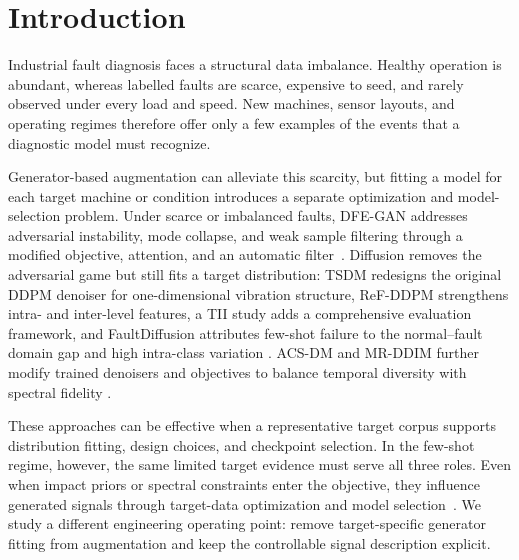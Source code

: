 \documentclass[a4paper,fleqn]{cas-sc}
\begin{document}
\maketitle

\section{Introduction}
\label{sec:intro}

Industrial fault diagnosis faces a structural data imbalance. Healthy
operation is abundant, whereas labelled faults are scarce, expensive to seed,
and rarely observed under every load and speed. New machines, sensor layouts,
and operating regimes therefore offer only a few examples of the events that a
diagnostic model must recognize.

Generator-based augmentation can alleviate this scarcity, but fitting a model
for each target machine or condition introduces a separate optimization and
model-selection problem. Under scarce or imbalanced faults, DFE-GAN addresses
adversarial instability, mode collapse, and weak sample filtering through a
modified objective, attention, and an automatic filter~\citep{liu2022dfegan}.
Diffusion removes the adversarial game but still fits a target distribution:
TSDM redesigns the original DDPM denoiser for one-dimensional vibration
structure, ReF-DDPM strengthens intra- and inter-level features, a TII study
adds a comprehensive evaluation framework, and FaultDiffusion attributes
few-shot failure to the normal--fault domain gap and high intra-class variation
\citep{yi2024tsdm,yu2024refddpm,yang2024ddpmaugmentation,
xu2025faultdiffusion}. ACS-DM and MR-DDIM further modify trained denoisers and
objectives to balance temporal diversity with spectral fidelity
\citep{tong2026acsdm,xu2026mrddim}.

These approaches can be effective when a representative target corpus supports
distribution fitting, design choices, and checkpoint selection. In the
few-shot regime, however, the same limited target evidence must serve all three
roles. Even when impact priors or spectral constraints enter the objective,
they influence generated signals through target-data optimization and model
selection~\citep{gao2025physicsgan,liu2026physicsdiffusion}. We study a
different engineering operating point: remove target-specific generator
fitting from augmentation and keep the controllable signal description
explicit.
\end{document}
